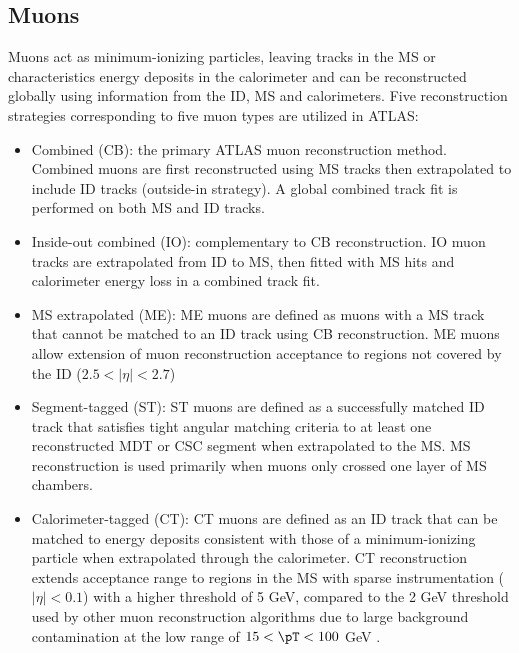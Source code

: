 \documentclass[../thesis.tex]{subfiles}
\begin{document}
\subsection{Muons}
Muons act as minimum-ionizing particles, leaving tracks in the \acs{MS} or characteristics energy deposits in the calorimeter and can be reconstructed globally using information from the \acs{ID}, \acs{MS} and calorimeters. Five reconstruction strategies corresponding to five muon types \citep{reco:muon_ID} are utilized in ATLAS:
\begin{itemize}
\item Combined (CB): the primary ATLAS muon reconstruction method. Combined muons are first reconstructed using \acs{MS} tracks then extrapolated to include \acs{ID} tracks (outside-in strategy). A global combined track fit is performed on both \acs{MS} and \acs{ID} tracks.
\item Inside-out combined (IO): complementary to CB reconstruction. IO muon tracks are extrapolated from \acs{ID} to \acs{MS}, then fitted with \acs{MS} hits and calorimeter energy loss in a combined track fit.
\item \acs{MS} extrapolated (ME): ME muons are defined as muons with a \acs{MS} track that cannot be matched to an \acs{ID} track using CB reconstruction. ME muons allow extension of muon reconstruction acceptance to regions not covered by the ID ($2.5<|\eta|<2.7$)
\item Segment-tagged (ST): ST muons are defined as a successfully matched \acs{ID} track that satisfies tight angular matching criteria to at least one reconstructed \acs{MDT} or \acs{CSC} segment when extrapolated to the \acs{MS}. MS reconstruction is used primarily when muons only crossed one layer of MS chambers.
\item Calorimeter-tagged (CT): CT muons are defined as an \acs{ID} track that can be matched to energy deposits consistent with those of a minimum-ionizing particle when extrapolated through the calorimeter. CT reconstruction extends acceptance range to regions in the \acs{MS} with sparse instrumentation ($|\eta|<0.1$) with a higher \pT threshold of 5 GeV, compared to the 2 GeV threshold used by other muon reconstruction algorithms due to large background contamination at the low \pT range of $15 < \pT < 100$ GeV \citep{reco:muon_ID2}.
\end{itemize}
\end{document}

